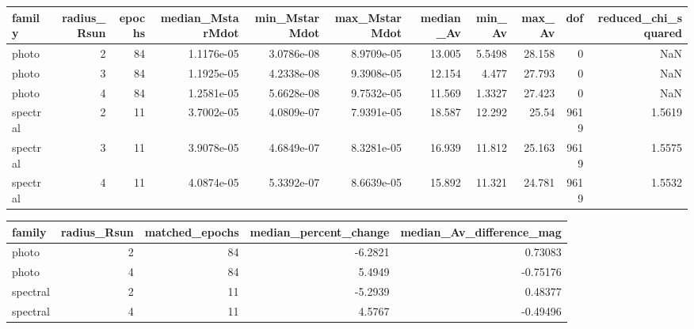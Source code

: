 \begin{tabular}{lrrrrrrrrrr}
\toprule
family & radius_Rsun & epochs & median_MstarMdot & min_MstarMdot & max_MstarMdot & median_Av & min_Av & max_Av & dof & reduced_chi_squared \\
\midrule
photo & 2 & 84 & 1.1176e-05 & 3.0786e-08 & 8.9709e-05 & 13.005 & 5.5498 & 28.158 & 0 & NaN \\
photo & 3 & 84 & 1.1925e-05 & 4.2338e-08 & 9.3908e-05 & 12.154 & 4.477 & 27.793 & 0 & NaN \\
photo & 4 & 84 & 1.2581e-05 & 5.6628e-08 & 9.7532e-05 & 11.569 & 1.3327 & 27.423 & 0 & NaN \\
spectral & 2 & 11 & 3.7002e-05 & 4.0809e-07 & 7.9391e-05 & 18.587 & 12.292 & 25.54 & 9619 & 1.5619 \\
spectral & 3 & 11 & 3.9078e-05 & 4.6849e-07 & 8.3281e-05 & 16.939 & 11.812 & 25.163 & 9619 & 1.5575 \\
spectral & 4 & 11 & 4.0874e-05 & 5.3392e-07 & 8.6639e-05 & 15.892 & 11.321 & 24.781 & 9619 & 1.5532 \\
\bottomrule
\end{tabular}

\begin{tabular}{lrrrr}
\toprule
family & radius_Rsun & matched_epochs & median_percent_change & median_Av_difference_mag \\
\midrule
photo & 2 & 84 & -6.2821 & 0.73083 \\
photo & 4 & 84 & 5.4949 & -0.75176 \\
spectral & 2 & 11 & -5.2939 & 0.48377 \\
spectral & 4 & 11 & 4.5767 & -0.49496 \\
\bottomrule
\end{tabular}
